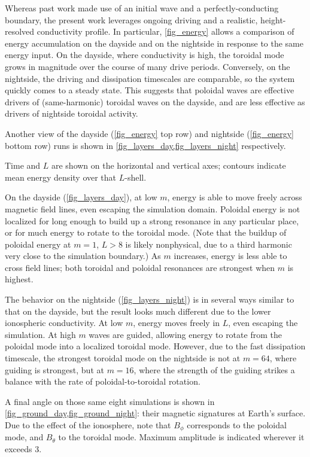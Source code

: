 \documentclass{article}
\newcommand{\azm}{\ensuremath{m}\xspace}
\begin{document}
Whereas past work made use of an initial wave and a perfectly-conducting boundary, the present work leverages ongoing driving and a realistic, height-resolved conductivity profile. In particular, \cref{fig_energy} allows a comparison of energy accumulation on the dayside and on the nightside in response to the same energy input. On the dayside, where conductivity is high, the toroidal mode grows in magnitude over the course of many drive periods. Conversely, on the nightside, the driving and dissipation timescales are comparable, so the system quickly comes to a steady state. This suggests that poloidal waves are effective drivers of (same-harmonic) toroidal waves on the dayside, and are less effective as drivers of nightside toroidal activity.

Another view of the dayside (\cref{fig_energy} top row) and nightside (\cref{fig_energy} bottom row) runs is shown in \cref{fig_layers_day,fig_layers_night} respectively.

Time and $L$ are shown on the horizontal and vertical axes; contours indicate mean energy density over that $L$-shell.

On the dayside (\cref{fig_layers_day}), at low \azm, energy is able to move freely across magnetic field lines, even escaping the simulation domain. Poloidal energy is not localized for long enough to build up a strong resonance in any particular place, or for much energy to rotate to the toroidal mode. (Note that the buildup of poloidal energy at $\azm = 1$, $L > 8$ is likely nonphysical, due to a third harmonic very close to the simulation boundary.) As \azm increases, energy is less able to cross field lines; both toroidal and poloidal resonances are strongest when \azm is highest.

The behavior on the nightside (\cref{fig_layers_night}) is in several ways similar to that on the dayside, but the result looks much different due to the lower ionospheric conductivity. At low \azm, energy moves freely in $L$, even escaping the simulation. At high \azm waves are guided, allowing energy to rotate from the poloidal mode into a localized toroidal mode. However, due to the fast dissipation timescale, the strongest toroidal mode on the nightside is not at $\azm = 64$, where guiding is strongest, but at $\azm = 16$, where the strength of the guiding strikes a balance with the rate of poloidal-to-toroidal rotation.

A final angle on those same eight simulations is shown in \cref{fig_ground_day,fig_ground_night}: their magnetic signatures at Earth's surface. Due to the effect of the ionosphere, note that $B_\phi$ corresponds to the poloidal mode, and $B_\theta$ to the toroidal mode. Maximum amplitude is indicated wherever it exceeds \SI{3}{\nT}.
\end{document}
